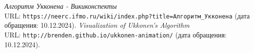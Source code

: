  
\begin{thebibliography}{99}
	
	{\itshape Алгоритм Укконена -  Викиконспекты} \\URL: \texttt{https://neerc.ifmo.ru/wiki/index.php?title=Алгоритм\_Укконена} (дата обращения: 10.12.2024).
	{\itshape Visualization of Ukkonen’s Algorithm} \\URL: \texttt{http://brenden.github.io/ukkonen-animation/} (дата обращения: 10.12.2024).
	
\end{thebibliography}
\pagebreak